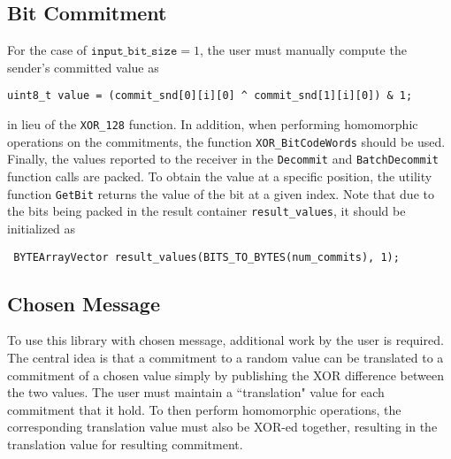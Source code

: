 \subsection{Bit Commitment}

For the case of $\texttt{input\_bit\_size} =1$, the user must manually compute the sender's committed value as 
\begin{lstlisting}     
uint8_t value = (commit_snd[0][i][0] ^ commit_snd[1][i][0]) & 1;
\end{lstlisting}
in lieu of the \texttt{XOR\_128} function. In addition, when performing homomorphic operations on the commitments, the function \texttt{XOR\_BitCodeWords} should be used. Finally, the values reported to the receiver in the \texttt{Decommit} and \texttt{BatchDecommit} function calls are packed. To obtain the value at a specific position, the utility function \texttt{GetBit} returns the value of the bit at a given index. Note that due to the bits being packed in the result container \texttt{result\_values}, it should be initialized as
\begin{lstlisting}     
 BYTEArrayVector result_values(BITS_TO_BYTES(num_commits), 1);
\end{lstlisting}

\subsection{Chosen Message}

To use this library with chosen message, additional work by the user is required. The central idea is that a commitment to a random value can be translated to a commitment of a chosen value simply by publishing the XOR difference between the two values. The user must maintain a ``translation" value for each commitment that it hold. To then perform homomorphic operations, the corresponding translation value must also be XOR-ed together, resulting in the translation value for resulting commitment.